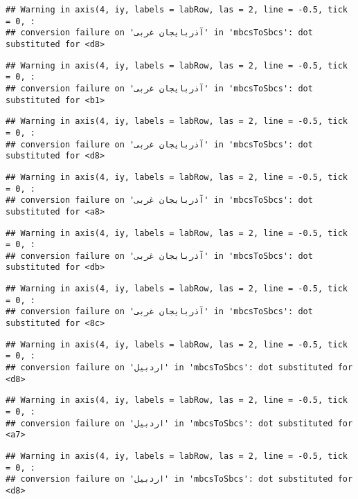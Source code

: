 \documentclass[
]{article}
\begin{document}
\begin{verbatim}
## Warning in axis(4, iy, labels = labRow, las = 2, line = -0.5, tick = 0, :
## conversion failure on 'آذربايجان غربی' in 'mbcsToSbcs': dot substituted for <d8>
\end{verbatim}

\begin{verbatim}
## Warning in axis(4, iy, labels = labRow, las = 2, line = -0.5, tick = 0, :
## conversion failure on 'آذربايجان غربی' in 'mbcsToSbcs': dot substituted for <b1>
\end{verbatim}

\begin{verbatim}
## Warning in axis(4, iy, labels = labRow, las = 2, line = -0.5, tick = 0, :
## conversion failure on 'آذربايجان غربی' in 'mbcsToSbcs': dot substituted for <d8>
\end{verbatim}

\begin{verbatim}
## Warning in axis(4, iy, labels = labRow, las = 2, line = -0.5, tick = 0, :
## conversion failure on 'آذربايجان غربی' in 'mbcsToSbcs': dot substituted for <a8>
\end{verbatim}

\begin{verbatim}
## Warning in axis(4, iy, labels = labRow, las = 2, line = -0.5, tick = 0, :
## conversion failure on 'آذربايجان غربی' in 'mbcsToSbcs': dot substituted for <db>
\end{verbatim}

\begin{verbatim}
## Warning in axis(4, iy, labels = labRow, las = 2, line = -0.5, tick = 0, :
## conversion failure on 'آذربايجان غربی' in 'mbcsToSbcs': dot substituted for <8c>
\end{verbatim}

\begin{verbatim}
## Warning in axis(4, iy, labels = labRow, las = 2, line = -0.5, tick = 0, :
## conversion failure on 'اردبیل' in 'mbcsToSbcs': dot substituted for <d8>
\end{verbatim}

\begin{verbatim}
## Warning in axis(4, iy, labels = labRow, las = 2, line = -0.5, tick = 0, :
## conversion failure on 'اردبیل' in 'mbcsToSbcs': dot substituted for <a7>
\end{verbatim}

\begin{verbatim}
## Warning in axis(4, iy, labels = labRow, las = 2, line = -0.5, tick = 0, :
## conversion failure on 'اردبیل' in 'mbcsToSbcs': dot substituted for <d8>
\end{verbatim}
\end{document}

